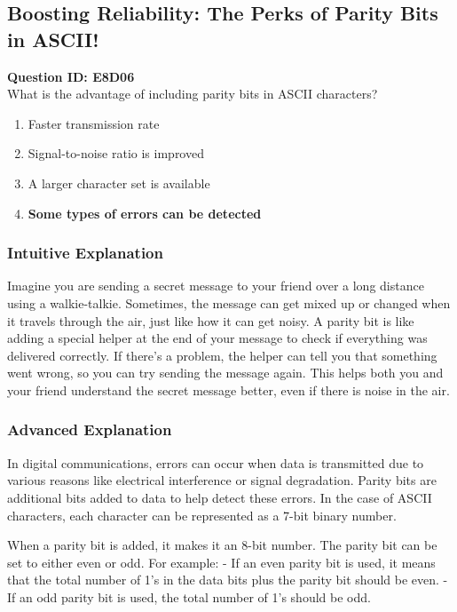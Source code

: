 \subsection{Boosting Reliability: The Perks of Parity Bits in ASCII!}

\begin{tcolorbox}[colback=blue!5!white, colframe=blue!75!black, title=Question E8D06]
    \textbf{Question ID: E8D06} \\
    What is the advantage of including parity bits in ASCII characters? \\
    \begin{enumerate}[label=\Alph*.]
        \item Faster transmission rate
        \item Signal-to-noise ratio is improved
        \item A larger character set is available
        \item \textbf{Some types of errors can be detected}
    \end{enumerate}
\end{tcolorbox}

\subsubsection{Intuitive Explanation}
Imagine you are sending a secret message to your friend over a long distance using a walkie-talkie. Sometimes, the message can get mixed up or changed when it travels through the air, just like how it can get noisy. A parity bit is like adding a special helper at the end of your message to check if everything was delivered correctly. If there’s a problem, the helper can tell you that something went wrong, so you can try sending the message again. This helps both you and your friend understand the secret message better, even if there is noise in the air.

\subsubsection{Advanced Explanation}
In digital communications, errors can occur when data is transmitted due to various reasons like electrical interference or signal degradation. Parity bits are additional bits added to data to help detect these errors. In the case of ASCII characters, each character can be represented as a 7-bit binary number. 

When a parity bit is added, it makes it an 8-bit number. The parity bit can be set to either even or odd. For example:
- If an even parity bit is used, it means that the total number of 1's in the data bits plus the parity bit should be even.
- If an odd parity bit is used, the total number of 1's should be odd.

